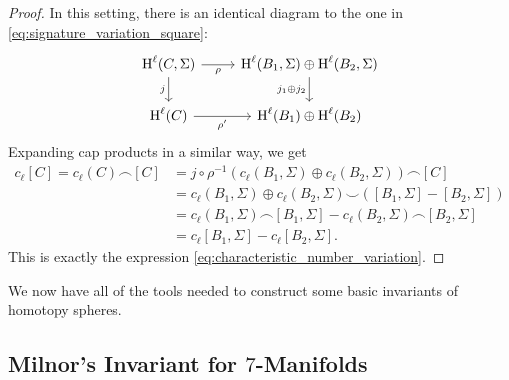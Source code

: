 \begin{proof}
	In this setting, there is an identical diagram to the one in \cref{eq:signature_variation_square}:
	\[
		\begin{tikzcd}
			{\H^{\ell}(C,\Sigma)} & {\H^{\ell}(B_1,\Sigma)\oplus\H^{\ell}(B_2,\Sigma)} \\
			{\H^{\ell}(C)} & {\H^{\ell}(B_1)\oplus\H^{\ell}(B_2)}
			\arrow["j_1\oplus j_2"', from=1-2, to=2-2]
			\arrow["\rho"', from=1-1, to=1-2]
			\arrow["j"', from=1-1, to=2-1]
			\arrow["\rho'"', from=2-1, to=2-2]
		\end{tikzcd}
	\]
	Expanding cap products in a similar way, we get
	\[
		\begin{aligned}
			c_\ell[C] = c_\ell(C)\frown [C]
			 & = j\circ\rho^{-1}(c_\ell(B_1,\Sigma)\oplus c_\ell(B_2,\Sigma))\frown [C]        \\
			 & = c_\ell(B_1,\Sigma)\oplus c_\ell(B_2,\Sigma)\smile([B_1, \Sigma]-[B_2,\Sigma]) \\
			 & = c_\ell(B_1,\Sigma)\frown [B_1,\Sigma] - c_\ell(B_2,\Sigma)\frown [B_2,\Sigma] \\
			 & = c_\ell[B_1,\Sigma] - c_\ell[B_2,\Sigma].
		\end{aligned}
	\]
	This is exactly the expression \cref{eq:characteristic_number_variation}.
\end{proof}

We now have all of the tools needed to construct some basic invariants of homotopy spheres.

\subsection*{Milnor's Invariant for $7$-Manifolds}

